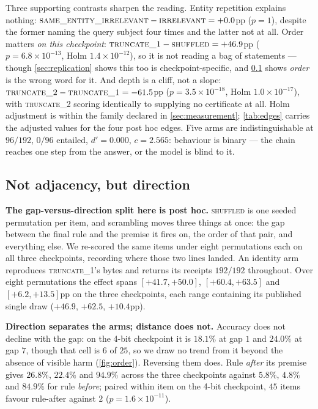 \documentclass[10pt,twocolumn]{article}
\begin{document}
Three supporting contrasts sharpen the reading. Entity repetition explains
nothing: $\textsc{same\_entity\_irrelevant} - \textsc{irrelevant} = +0.0$pp
($p = 1$), despite the former naming the query subject four times and the latter
not at all. Order matters \emph{on this checkpoint}:
$\textsc{truncate\_1} - \textsc{shuffled} = +46.9$pp
($p = 6.8\times10^{-13}$, Holm $1.4\times10^{-12}$), so it is not reading a bag
of statements --- though \cref{sec:replication} shows this too is
checkpoint-specific, and \cref{sec:order} shows \emph{order} is the wrong word
for it. And depth is a cliff, not a slope:
$\textsc{truncate\_2} - \textsc{truncate\_1} = -61.5$pp
($p = 3.5\times10^{-18}$, Holm $1.0\times10^{-17}$), with \textsc{truncate\_2}
scoring identically to supplying no certificate at all. Holm adjustment is within the family declared in \cref{sec:measurement};
\cref{tab:edges} carries the adjusted values for the four post hoc edges. Five arms are indistinguishable at $96/192$, $0/96$ entailed, $d' = 0.000$,
$c = 2.565$: behaviour is binary --- the chain reaches one step from the answer,
or the model is blind to it.

\subsection{Not adjacency, but direction}
\label{sec:order}

\textbf{The gap-versus-direction split here is post hoc.} \textsc{shuffled} is one
seeded permutation per item, and scrambling moves three
things at once: the gap between the final rule and the premise it fires on, the
order of that pair, and everything else. We re-scored the same items under eight
permutations each on all three checkpoints, recording where those two lines
landed. An identity arm reproduces \textsc{truncate\_1}'s bytes and returns its
receipts $192/192$ throughout. Over eight permutations the effect spans $[+41.7, +50.0]$, $[+60.4, +63.5]$ and
$[+6.2, +13.5]$pp on the three checkpoints, each range containing its published
single draw ($+46.9$, $+62.5$, $+10.4$pp).

\textbf{Direction separates the arms; distance does not.} Accuracy does not
decline with the gap: on the 4-bit checkpoint it is $18.1\%$ at gap $1$ and
$24.0\%$ at gap $7$, though that cell is $6$ of $25$, so we draw no trend from it beyond the absence
of visible harm (\cref{fig:order}). Reversing
them does. Rule \emph{after} its premise gives $26.8\%$, $22.4\%$ and $94.9\%$
across the three checkpoints against $5.8\%$, $4.8\%$ and $84.9\%$ for rule
\emph{before}; paired within item on the 4-bit checkpoint, $45$ items favour
rule-after against $2$ ($p = 1.6\times10^{-11}$).
\end{document}

